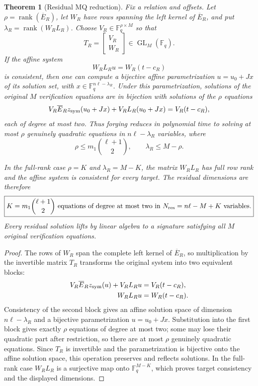 \documentclass[11pt]{article}
\newtheorem{theorem}{Theorem}
\newcommand{\F}{\mathbb F}
\newcommand{\rank}{\operatorname{rank}}
\begin{document}
\begin{theorem}[Residual MQ reduction]\label{thm:residual}
Fix a relation and offsets.  Let $\rho=\rank(\overline E_R)$, let $W_R$ have
rows spanning the left kernel of $\overline E_R$, and put
$\lambda_R=\rank(W_RL_R)$.  Choose $V_R\in\F_q^{\rho\times M}$ so that
\[
 T_R=\begin{bmatrix}V_R\\W_R\end{bmatrix}\in\operatorname{GL}_M(\F_q).
\]
If the affine system
\[
 W_RL_Ru=W_R(t-c_R)
\]
is consistent, then one can compute a bijective affine parametrization
$u=u_0+Jx$ of its solution set, with
$x\in\F_q^{n\ell-\lambda_R}$.  Under this parametrization, solutions of the
original $M$ verification equations are in bijection with solutions of the
$\rho$ equations
\[
 V_R\overline E_R z_{\rm sym}(u_0+Jx)
 +V_RL_R(u_0+Jx)=V_R(t-c_R),
\]
each of degree at most two.  Thus forging reduces in polynomial time to
solving at most $\rho$ genuinely quadratic equations in
$n\ell-\lambda_R$ variables, where
\[
 \rho\le m_1\binom{\ell+1}{2},
 \qquad
 \lambda_R\le M-\rho.
\]

In the full-rank case $\rho=K$ and $\lambda_R=M-K$, the matrix $W_RL_R$ has
full row rank and the affine system is consistent for every target.  The
residual dimensions are therefore
\begin{equation}\label{eq:resparams}
 \boxed{
 K=m_1\binom{\ell+1}{2}\text{ equations of degree at most two in }
 N_{\rm res}=n\ell-M+K\text{ variables}.}
\end{equation}
Every residual solution lifts by linear algebra to a signature satisfying all
$M$ original verification equations.
\end{theorem}

\begin{proof}
The rows of $W_R$ span the complete left kernel of $\overline E_R$, so
multiplication by the invertible matrix $T_R$ transforms the original system
into two equivalent blocks:
\[
\begin{aligned}
 V_R\overline E_Rz_{\rm sym}(u)+V_RL_Ru&=V_R(t-c_R),\\
 W_RL_Ru&=W_R(t-c_R).
\end{aligned}
\]
Consistency of the second block gives an affine solution space of dimension
$n\ell-\lambda_R$ and a bijective parametrization $u=u_0+Jx$.  Substitution
into the first block gives exactly $\rho$ equations of degree at most two;
some may lose their quadratic part after restriction, so there are at most
$\rho$ genuinely quadratic equations.  Since $T_R$ is invertible and the
parametrization is bijective onto the affine solution space, this operation
preserves and reflects solutions.  In the full-rank case $W_RL_R$ is a
surjective map onto $\F_q^{M-K}$, which proves target consistency and the
displayed dimensions.
\end{proof}
\end{document}
